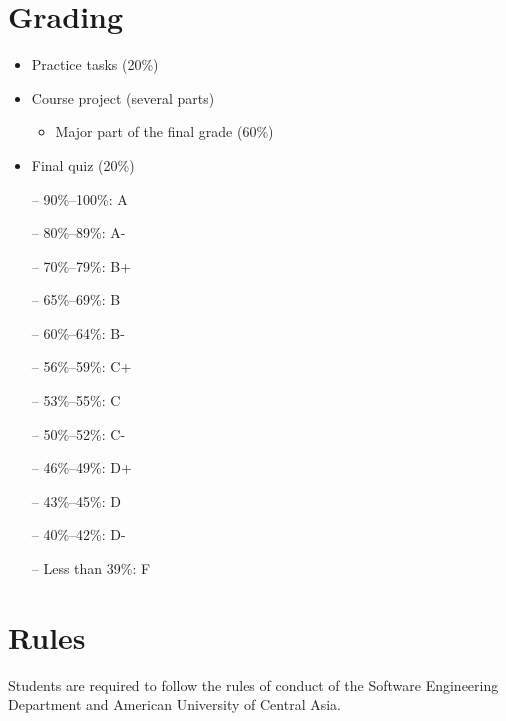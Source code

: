\documentclass[12pt,a4paper,oneside]{article}
\begin{document}
    \section{Grading}

        \begin{itemize}
            \item Practice tasks (20\%)
            \item Course project (several parts)
            \begin{itemize}
                \item Major part of the final grade (60\%)
            \end{itemize}
            \item Final quiz (20\%)
        \end{itemize}

        \begin{itemize} \itemsep-10pt \parskip0pt 
            \item[--] 90\%--100\%: A\\
            \item[--] 80\%--89\%: A-\\
            \item[--] 70\%--79\%: B+\\
            \item[--] 65\%--69\%: B\\
            \item[--] 60\%--64\%: B-\\
            \item[--] 56\%--59\%: C+\\
            \item[--] 53\%--55\%: C\\
            \item[--] 50\%--52\%: C-\\
            \item[--] 46\%--49\%: D+\\
            \item[--] 43\%--45\%: D\\
            \item[--] 40\%--42\%: D-\\
            \item[--] Less than 39\%: F
        \end{itemize}

    \section{Rules}

        Students are required to follow the rules of conduct of the Software
        Engineering Department and American University of Central Asia.
\end{document}
